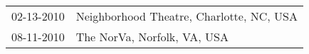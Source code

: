 \begin{supertabular}{ll}
 02-13-2010 &  Neighborhood Theatre, Charlotte, NC, USA \\
 08-11-2010 &               The NorVa, Norfolk, VA, USA \\
\end{supertabular}
